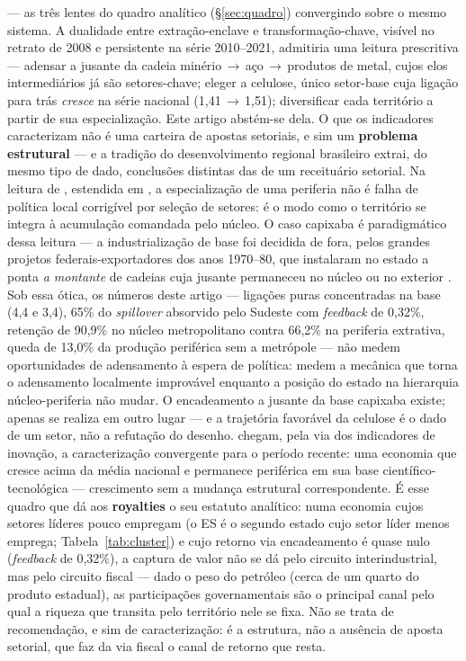 \documentclass[11pt,a4paper]{article}
\begin{document}
--- as três lentes do quadro analítico (\S\ref{sec:quadro}) convergindo sobre o mesmo
sistema.
A dualidade entre extração-enclave e
transformação-chave, visível no retrato de 2008 e persistente na série 2010--2021,
admitiria uma leitura prescritiva --- adensar a jusante da cadeia
minério\,$\to$\,aço\,$\to$\,produtos de metal, cujos elos intermediários já são
setores-chave; eleger a celulose, único setor-base cuja ligação para trás \emph{cresce} na
série nacional (1,41\,$\to$\,1,51); diversificar cada território a partir de sua
especialização. Este artigo abstém-se dela. O que os indicadores caracterizam não é uma
carteira de apostas setoriais, e sim um \textbf{problema estrutural} --- e a tradição do
desenvolvimento regional brasileiro extrai, do mesmo tipo de dado, conclusões distintas
das de um receituário setorial. Na leitura de \citet{cano1985}, estendida em
\citet{cano2008desconcentracao}, a especialização de uma periferia não é falha de política
local corrigível por seleção de setores: é o modo como o território se integra à
acumulação comandada pelo núcleo. O caso capixaba é paradigmático dessa leitura --- a
industrialização de base foi decidida de fora, pelos grandes projetos
federais-exportadores dos anos 1970--80, que instalaram no estado a ponta \emph{a
montante} de cadeias cuja jusante permaneceu no núcleo ou no exterior
\citep{macedo2002integracao}. Sob essa ótica, os números deste artigo --- ligações puras
concentradas na base (4,4 e 3,4), 65\% do \emph{spillover} absorvido pelo Sudeste com
\emph{feedback} de 0,32\%, retenção de 90,9\% no núcleo metropolitano contra 66,2\% na
periferia extrativa, queda de 13,0\% da produção periférica sem a metrópole --- não medem
oportunidades de adensamento à espera de política: medem a mecânica que torna o
adensamento localmente improvável enquanto a posição do estado na hierarquia
núcleo-periferia não mudar. O encadeamento a jusante da base capixaba existe; apenas se
realiza em outro lugar --- e a trajetória favorável da celulose é o dado de um setor, não
a refutação do desenho. \citet{cacador2009olhar} chegam, pela via dos indicadores de
inovação, a caracterização convergente para o período recente: uma economia que cresce
acima da média nacional e permanece periférica em sua base científico-tecnológica ---
crescimento sem a mudança estrutural correspondente. É esse quadro que dá aos
\textbf{royalties} o seu estatuto analítico: numa economia cujos setores líderes pouco
empregam (o ES é o segundo estado cujo setor líder menos emprega; Tabela~\ref{tab:cluster})
e cujo retorno via encadeamento é quase nulo (\emph{feedback} de 0,32\%), a captura de
valor não se dá pelo circuito interindustrial, mas pelo circuito fiscal --- dado o peso do
petróleo (cerca de um quarto do produto estadual), as participações governamentais são o
principal canal pelo qual a riqueza que transita pelo território nele se fixa. Não se
trata de recomendação, e sim de caracterização: é a estrutura, não a ausência de aposta
setorial, que faz da via fiscal o canal de retorno que resta.
\end{document}
